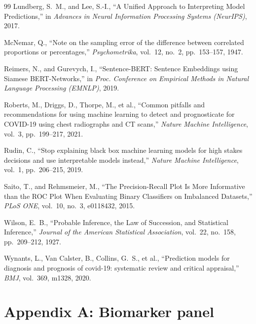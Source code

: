 \documentclass[11pt,a4paper]{article}
\begin{document}
\begin{thebibliography}{99}
\bibspace
{}
Lundberg, S.~M., and Lee, S.-I.,
\newblock ``{A Unified Approach to Interpreting Model Predictions},''
\newblock in \emph{Advances in Neural Information Processing Systems (NeurIPS)},
2017.

\bibspace
{}
McNemar, Q.,
\newblock ``{Note on the sampling error of the difference between correlated
proportions or percentages},''
\newblock \emph{Psychometrika}, vol.~12, no.~2, pp.~153--157, 1947.

\bibspace
{}
Reimers, N., and Gurevych, I.,
\newblock ``{Sentence-BERT: Sentence Embeddings using Siamese BERT-Networks},''
\newblock in \emph{Proc. Conference on Empirical Methods in Natural Language
Processing (EMNLP)}, 2019.

\bibspace
{}
Roberts, M., Driggs, D., Thorpe, M., et al.,
\newblock ``{Common pitfalls and recommendations for using machine learning to
detect and prognosticate for COVID-19 using chest radiographs and CT scans},''
\newblock \emph{Nature Machine Intelligence}, vol.~3, pp.~199--217, 2021.

\bibspace
{}
Rudin, C.,
\newblock ``{Stop explaining black box machine learning models for high stakes
decisions and use interpretable models instead},''
\newblock \emph{Nature Machine Intelligence}, vol.~1, pp.~206--215, 2019.

\bibspace
{}
Saito, T., and Rehmsmeier, M.,
\newblock ``{The Precision-Recall Plot Is More Informative than the ROC Plot When
Evaluating Binary Classifiers on Imbalanced Datasets},''
\newblock \emph{PLoS ONE}, vol.~10, no.~3, e0118432, 2015.

\bibspace
{}
Wilson, E.~B.,
\newblock ``{Probable Inference, the Law of Succession, and Statistical
Inference},''
\newblock \emph{Journal of the American Statistical Association}, vol.~22,
no.~158, pp.~209--212, 1927.

\bibspace
{}
Wynants, L., Van Calster, B., Collins, G.~S., et al.,
\newblock ``{Prediction models for diagnosis and prognosis of covid-19: systematic
review and critical appraisal},''
\newblock \emph{BMJ}, vol.~369, m1328, 2020.

\end{thebibliography}

\newpage
\appendix
\section*{Appendix A: Biomarker panel}
\end{document}
